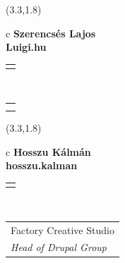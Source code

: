 \documentclass[11pt]{article}
\begin{document}
\makebox(3.3,1.8){
  \renewcommand\arraystretch{1.3}
  \begin{tabular}[c]{c}
    \hspace{8.5mm}
    \LARGE\bf{ Szerencsés Lajos }\\
    \hspace{8.5mm}
    \Large{ Luigi.hu }\\
    \renewcommand\arraystretch{3}
    \begin{tabular}[c]{c}
      \centering
      \fontfamily{phv}\selectfont{
        \textbf{
          \textsc{
            \scriptsize{
            \color{Bright}{ Ismerkedő }\color{Dark}{ Webmester }\color{Bright}{ Sminkmester }\color{Bright}{ Programozó }
            }
          }
        }
      }
    \end{tabular}
    \\
    \renewcommand\arraystretch{1}
    \begin{tabular}{p{3.3in}}
      \hspace{.7cm}\\
      \hspace{.7cm}\emph{  }\\
    \end{tabular}
  \end{tabular}
}

\makebox(3.3,1.8){
  \renewcommand\arraystretch{1.3}
  \begin{tabular}[c]{c}
    \hspace{8.5mm}
    \LARGE\bf{ Hosszu Kálmán }\\
    \hspace{8.5mm}
    \Large{ hosszu.kalman }\\
    \renewcommand\arraystretch{3}
    \begin{tabular}[c]{c}
      \centering
      \fontfamily{phv}\selectfont{
        \textbf{
          \textsc{
            \scriptsize{
            \color{Bright}{ Ismerkedő }\color{Bright}{ Webmester }\color{Dark}{ Sminkmester }\color{Dark}{ Programozó }
            }
          }
        }
      }
    \end{tabular}
    \\
    \renewcommand\arraystretch{1}
    \begin{tabular}{p{3.3in}}
      \hspace{.7cm}Factory Creative Studio\\
      \hspace{.7cm}\emph{ Head of Drupal Group }\\
    \end{tabular}
  \end{tabular}
}
\end{document}
